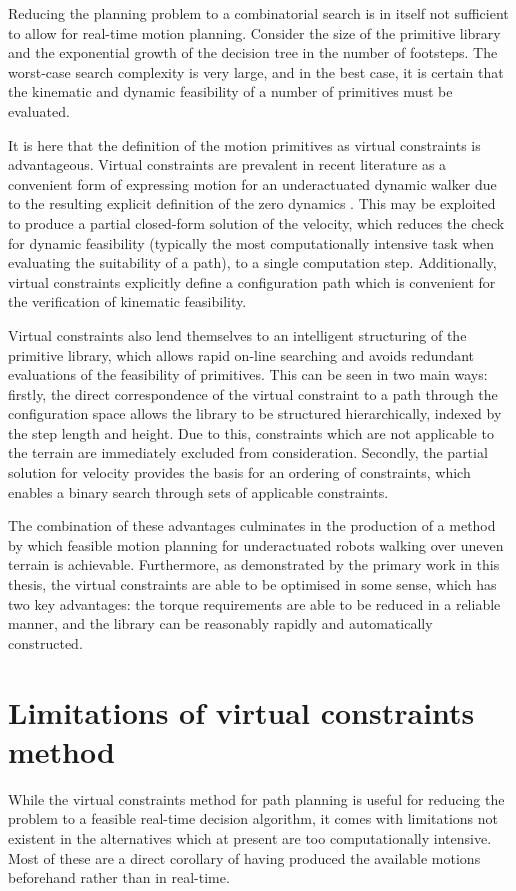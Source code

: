Reducing the planning problem to a combinatorial search is in itself not sufficient to allow for real-time motion planning. Consider the size of the primitive library and the exponential growth of the decision tree in the number of footsteps. The worst-case search complexity is very large, and in the best case, it is certain that the kinematic and dynamic feasibility of a number of primitives must be evaluated.

It is here that the definition of the motion primitives as virtual constraints is advantageous. Virtual constraints are prevalent in recent literature as a convenient form of expressing motion for an underactuated dynamic walker due to the resulting explicit definition of the zero dynamics \cite{westervelt2003hybrid, sreenath2011compliant, martin2014design}. This may be exploited to produce a partial closed-form solution of the velocity, which reduces the check for dynamic feasibility (typically the most computationally intensive task when evaluating the suitability of a path), to a single computation step. Additionally, virtual constraints explicitly define a configuration path which is convenient for the verification of kinematic feasibility.

Virtual constraints also lend themselves to an intelligent structuring of the primitive library, which allows rapid on-line searching and avoids redundant evaluations of the feasibility of primitives. This can be seen in two main ways: firstly, the direct correspondence of the virtual constraint to a path through the configuration space allows the library to be structured hierarchically, indexed by the step length and height. Due to this, constraints which are not applicable to the terrain are immediately excluded from consideration. Secondly, the partial solution for velocity provides the basis for an ordering of constraints, which enables a binary search through sets of applicable constraints. 

The combination of these advantages culminates in the production of a method by which feasible motion planning for underactuated robots walking over uneven terrain is achievable. Furthermore, as demonstrated by the primary work in this thesis, the virtual constraints are able to be optimised in some sense, which has two key advantages: the torque requirements are able to be reduced in a reliable manner, and the library can be reasonably rapidly and automatically constructed.

\section{Limitations of virtual constraints method}
While the virtual constraints method for path planning is useful for reducing the problem to a feasible real-time decision algorithm, it comes with limitations not existent in the alternatives which at present are too computationally intensive. Most of these are a direct corollary of having produced the available motions beforehand rather than in real-time.

